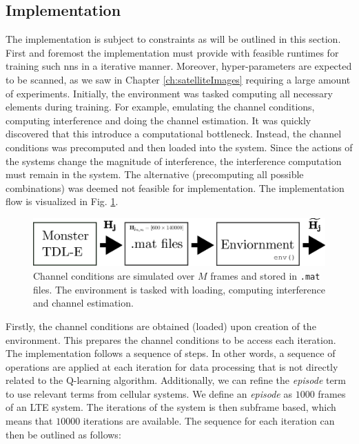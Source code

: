 \subsection{Implementation}
The implementation is subject to constraints as will be outlined in this section. First and foremost the implementation must provide with feasible runtimes for training such \glspl{nn} in a iterative manner. Moreover, hyper-parameters are expected to be scanned, as we saw in Chapter \ref{ch:satelliteImages} requiring a large amount of experiments. Initially, the environment was tasked computing all necessary elements during training. For example, emulating the channel conditions, computing interference and doing the channel estimation. It was quickly discovered that this introduce a computational bottleneck. Instead, the channel conditions was precomputed and then loaded into the system. Since the actions of the systems change the magnitude of interference, the interference computation must remain in the system. The alternative (precomputing all possible combinations) was deemed not feasible for implementation. The implementation flow is visualized in Fig. \ref{fig:environment_implementation}. 
\begin{figure}
    \centering
    \includegraphics{chapters/part_uplink/figures/environment_implementation.eps}
    \caption{Channel conditions are simulated over $M$ frames and stored in \texttt{.mat} files. The environment is tasked with loading, computing interference and channel estimation.}
    \label{fig:environment_implementation}
\end{figure}

Firstly, the channel conditions are obtained (loaded) upon creation of the environment. This prepares the channel conditions to be access each iteration. The implementation follows a sequence of steps. In other words, a sequence of operations are applied at each iteration for data processing that is not directly related to the Q-learning algorithm. Additionally, we can refine the \emph{episode} term to use relevant terms from cellular systems. We define an \emph{episode} as $1000$ frames of an LTE system. The iterations of the system is then subframe based, which means that $10000$ iterations are available.  The sequence for each iteration can then be outlined as follows:

